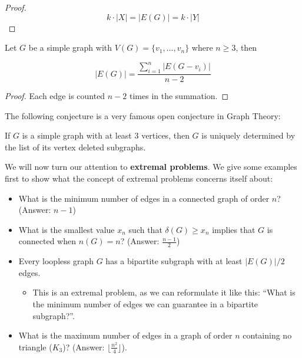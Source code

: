 \begin{proof}
	\begin{equation}
		k \cdot |X| = |E(G)| = k \cdot |Y|
	\end{equation}
\end{proof}

\begin{proposition}
	Let $G$ be a simple graph with 	$V(G) = \{v_{1}, \ldots, v_{n}\}$ where $n \ge 3$, then

	\begin{equation}
		|E(G)| = \frac{ \sum_{i=1}^n  |E(G-v_{i})| }{n-2}
	\end{equation}
\end{proposition}
\begin{proof}
	Each edge is counted $n-2$ times in the summation.
\end{proof}

The following conjecture is a very famous open conjecture in Graph Theory:

\begin{conjecture}
	If $G$ is a simple graph with at least 3 vertices, then $G$ is uniquely determined by the list of its vertex deleted subgraphs.
\end{conjecture}

We will now turn our attention to \textbf{extremal problems}. We give some examples first to show what the concept of extremal problems concerns itself about:
\begin{itemize}
	\item What is the minimum number of edges in a connected graph of order $n$? (Answer: $n-1$)
	\item What is the smallest value $x_{n}$ such that $\delta(G) \ge x_{n}$ implies that $G$ is connected when $n(G) = n$? (Answer: $\frac{n-1}{2}$)
	\item Every loopless graph $G$ has a bipartite subgraph with at least $|E(G)|/2$ edges.
	      \begin{itemize}
		      \item This is an extremal problem, as we can reformulate it like this: ``What is the minimum number of edges we can guarantee in a bipartite subgraph?''.
	      \end{itemize}
	\item What is the maximum number of edges in a graph of order $n$ containing no triangle ($K_{3}$)? (Answer: $\lfloor \frac{n^{2}}{4} \rfloor$).
\end{itemize}

